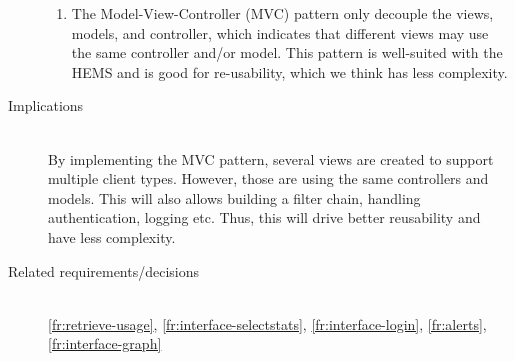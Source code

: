 \begin{description}
\begin{enumerate}
\item The Model-View-Controller (MVC) pattern only decouple the views, models, and controller, which indicates that different views may use the same controller and/or model. This pattern is well-suited with the HEMS and is good for re-usability, which we think has less complexity.

\end{enumerate}

\item [Implications]~\\
By implementing the MVC pattern, several views are created to support multiple client types. However, those are using the same controllers and models. This will also allows building a filter chain, handling authentication, logging etc. Thus, this will drive better reusability and have less complexity.

\item [Related requirements/decisions]~\\
\ref{fr:retrieve-usage}, \ref{fr:interface-selectstats}, \ref{fr:interface-login}, \ref{fr:alerts}, \ref{fr:interface-graph} 

\end{description}



